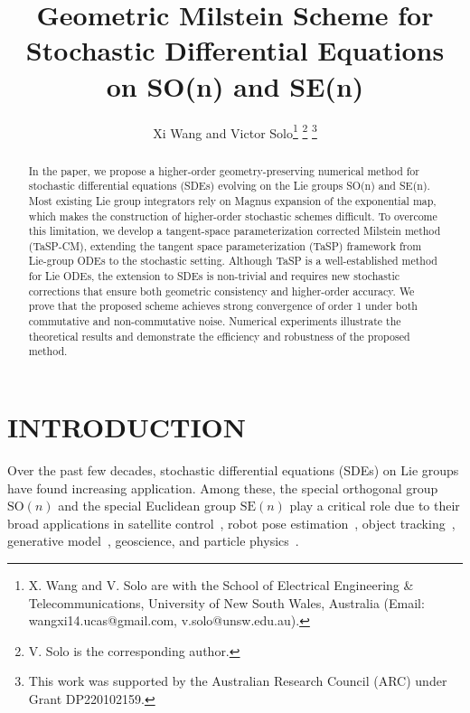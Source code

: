 \documentclass[11pt, a4paper, onecolumn]{article}
\title{\huge Geometric Milstein Scheme for Stochastic Differential Equations on SO(n) and SE(n)}
\author{%
    Xi Wang and
    Victor Solo\thanks{X. Wang and V. Solo are with the School of Electrical Engineering \& Telecommunications, University of New South Wales,  Australia (Email: wangxi14.ucas@gmail.com, v.solo@unsw.edu.au).} \thanks{V. Solo is the corresponding author.}
     \thanks{This work was supported by the Australian Research Council (ARC) under Grant DP220102159.}
}
\date{}
\begin{document}
\maketitle

\begin{abstract}
    In the paper, we propose a higher-order geometry-preserving numerical method for stochastic differential equations (SDEs) evolving on the Lie groups SO(n) and SE(n). Most existing Lie group integrators rely on Magnus expansion of the exponential map, which makes the construction of higher-order stochastic schemes difficult. To overcome this limitation, we develop a tangent-space parameterization corrected Milstein method (TaSP-CM), extending the tangent space parameterization (TaSP) framework from Lie-group ODEs to the stochastic setting. Although TaSP is a well-established method for Lie ODEs, the extension to SDEs is non-trivial and requires new stochastic corrections that ensure both geometric consistency and higher-order accuracy. We prove that the proposed scheme achieves strong convergence of order 1 under both commutative and non-commutative noise. Numerical experiments illustrate the theoretical results and demonstrate the efficiency and robustness of the proposed method.
\end{abstract}

\section{INTRODUCTION}

    Over the past few decades, stochastic differential equations (SDEs) on Lie groups have found increasing application. Among these, the special orthogonal group $\mathrm{SO}(n)$ and the special Euclidean group $\mathrm{SE}(n)$ play a critical role due to their broad applications in satellite control~\cite{brockett1973lie,hsu2002stochastic}, robot pose estimation~\cite{kwon2007particle}, object tracking~\cite{soatto1996motion}, generative model~\cite{bortoli2022riemannian,park2022riemannian}, geoscience, and particle physics~\cite{david2022geometric,forest2006geometric}.
\end{document}
